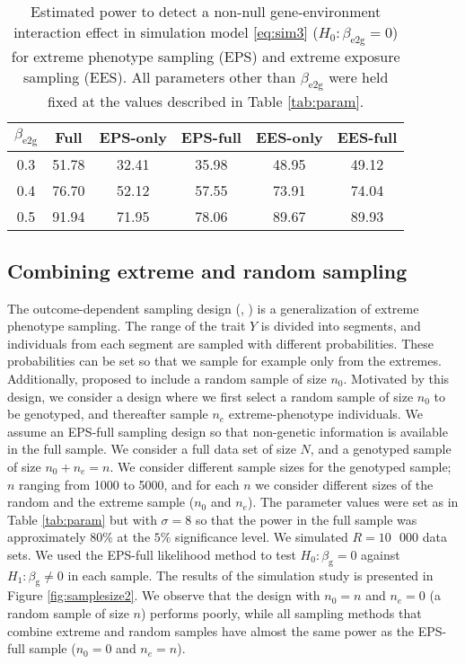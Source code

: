 \documentclass[10pt,a4paper]{article}
\begin{document}
\begin{table}[h]
\centering
	\begin{tabular}{cccccc}
	\hline
	\rule{0pt}{2.5ex}
	$\beta_{\text{e}2\text{g}}$ & Full & EPS-only & EPS-full  & EES-only & EES-full \\
	\hline
	\rule{0pt}{2.5ex}
 0.3 & 51.78& 32.41 &35.98 &48.95& 49.12 \\
 0.4 & 76.70 &52.12 &57.55 &73.91& 74.04 \\
 0.5 & 91.94 &71.95& 78.06 &89.67& 89.93 \\
	\hline
	\end{tabular}
	\caption{Estimated power to detect a non-null gene-environment interaction effect in simulation model \eqref{eq:sim3} ($H_0: \beta_{\text{e}2\text{g}} = 0$) for extreme phenotype sampling (EPS) and extreme exposure sampling (EES). All parameters other than $\beta_{\text{e}2\text{g}}$ were held fixed at the values described in Table \ref{tab:param}.}
	\label{tab:sim3ees}
\end{table}

\subsection{Combining extreme and random sampling}
The outcome-dependent sampling design (\cite{zhou2002semiparametric}, \cite{weaver2005ods}) is a generalization of extreme phenotype sampling. The range of the trait $Y$ is divided into segments, and individuals from each segment are sampled with different probabilities. These probabilities can be set so that we sample for example only from the extremes. Additionally, \cite{zhou2002semiparametric} proposed to include a random sample of size $n_0$. Motivated by this design, we consider a design where we first select a random sample of size $n_0$ to be genotyped, and thereafter sample $n_e$ extreme-phenotype individuals. We assume an EPS-full sampling design so that non-genetic information is available in the full sample. We consider a full data set of size $N$, and a genotyped sample of size $n_0 + n_e = n$. We consider different sample sizes for the genotyped sample; $n$ ranging from 1000 to 5000, and for each $n$ we consider different sizes of the random and the extreme sample ($n_0$ and $n_e$). The parameter values were set as in Table \ref{tab:param} but with $\sigma = 8$ so that the power in the full sample was approximately $80\%$ at the $5\%$ significance level. We simulated $R = 10 \text{ } 000$ data sets. We used the EPS-full likelihood method to test $H_0: \beta_{\text{g}} = 0$ against $H_1: \beta_{\text{g}} \neq 0$ in each sample. The results of the simulation study is presented in Figure \ref{fig:samplesize2}. We observe that the design with $n_0 = n$ and $n_e = 0$ (a random sample of size $n$) performs poorly, while all sampling methods that combine extreme and random samples have almost the same power as the EPS-full sample ($n_0 = 0$ and $n_e = n$).
\end{document}

